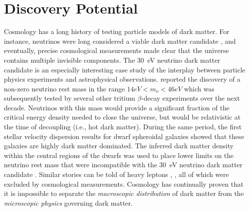 \chapter{Discovery Potential }
\label{sec:discovery}
\bigskip

Cosmology has a long history of testing particle models of dark matter.
For instance, neutrinos were long considered a viable dark matter candidate \citep[\eg,][]{Kolb:1988}, and eventually, precise cosmological measurements made clear that the universe contains multiple invisible components.
The 30~eV neutrino dark matter candidate is an especially interesting case study of the interplay between particle physics experiments and astrophysical observations.
\citet{Lyubimov:1980un} reported the discovery of a non-zero neutrino rest mass in the range $14 \unit{eV} < m_{\nu} < 46 \unit{eV}$ which was subsequently tested by several other tritium $\beta$-decay experiments over the next decade.
Neutrinos with this mass would provide a significant fraction of the critical energy density needed to close the universe, but would be relativistic at the time of decoupling (i.e., hot dark matter).
During the same period, the first stellar velocity dispersion results for dwarf spheroidal galaxies showed that these galaxies are highly dark matter dominated.
The inferred dark matter density within the central regions of the dwarfs
was used to place lower limits on the neutrino rest mass that were incompatible with the 30~eV neutrino dark matter candidate \citep{Aaronson:1983,Gerhard:1992}.
Similar stories can be told of heavy leptons \citep{Gunn:1978}, , all of which were excluded by cosmological measurements.
Cosmology has continually proven that it is impossible to separate the \emph{macroscopic distribution} of dark matter from the \emph{microscopic physics} governing dark matter.

